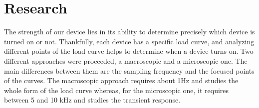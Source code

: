 %
%
\section{Research}

The strength of our device lies in its ability to determine precisely which device is turned on or not. Thankfully, each device has a specific load curve, and analyzing different points of the load curve helps to determine when a device turns on. Two different approaches were proceeded, a macroscopic and a microscopic one. The main differences between them are the sampling frequency and the focused points of the curves. The macroscopic approach requires about 1Hz and studies the whole form of the load curve whereas, for the microscopic one, it requires between 5 and 10 kHz and studies the transient response.





